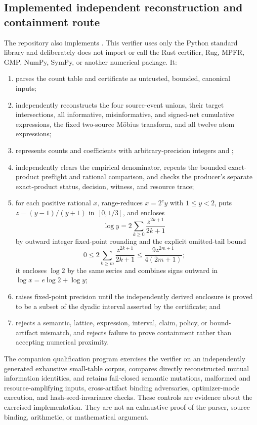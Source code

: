 \documentclass[11pt]{article}
\begin{document}
\subsection{Implemented independent reconstruction and containment route}

The repository also implements
.  This verifier uses only the
Python standard library and deliberately does not import or call the Rust certifier, Rug, MPFR,
GMP, NumPy, SymPy, or another numerical package.  It:
\begin{enumerate}[leftmargin=*]
  \item parses the count table and certificate as untrusted, bounded, canonical inputs;
  \item independently reconstructs the four source-event unions, their target intersections, all
  informative, misinformative, and signed-net cumulative expressions, the fixed two-source
  M{\"o}bius transform, and all twelve atom expressions;
  \item represents counts and coefficients with arbitrary-precision integers and
  ;
  \item independently clears the empirical denominator, repeats the bounded exact-product
  preflight and rational comparison, and checks the producer's separate exact-product status,
  decision, witness, and resource trace;
  \item for each positive rational \(x\), range-reduces \(x=2^e y\) with \(1\leq y<2\), puts
  \(z=(y-1)/(y+1)\) in \([0,1/3]\), and encloses
  \[
    \log y
      =2\sum_{k\geq 0}\frac{z^{2k+1}}{2k+1}
  \]
  by outward integer fixed-point rounding and the explicit omitted-tail bound
  \[
    0\leq
    2\sum_{k\geq m}\frac{z^{2k+1}}{2k+1}
    \leq \frac{9z^{2m+1}}{4(2m+1)};
  \]
  it encloses \(\log 2\) by the same series and combines signs outward in
  \(\log x=e\log 2+\log y\);
  \item raises fixed-point precision until the independently derived enclosure is proved to be a
  subset of the dyadic interval asserted by the certificate; and
  \item rejects a semantic, lattice, expression, interval, claim, policy, or bound-artifact
  mismatch, and rejects failure to prove containment rather than accepting numerical proximity.
\end{enumerate}

The companion qualification program
 exercises the verifier on
an independently generated exhaustive small-table corpus, compares directly reconstructed mutual
information identities, and retains fail-closed semantic mutations, malformed and
resource-amplifying inputs, cross-artifact binding adversaries, optimizer-mode execution, and
hash-seed-invariance checks.  These controls are evidence about the exercised implementation.
They are not an exhaustive proof of the parser, source binding, arithmetic, or mathematical
argument.
\end{document}
